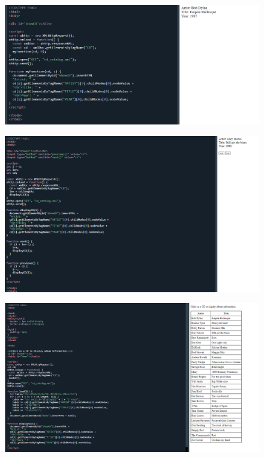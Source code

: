 \documentclass{article}
\begin{document}
\begin{itemize}
		\begin{figure}[H]
			\centering
			\includegraphics[width=1.0\textwidth,keepaspectratio]{img/F14.png}
		\end{figure}

		\begin{figure}[H]
			\centering
			\includegraphics[width=1.0\textwidth,keepaspectratio]{img/F15.png}
		\end{figure}
		\begin{figure}[H]
			\centering
			\includegraphics[width=1.0\textwidth,keepaspectratio]{img/F16.png}
		\end{figure}
	\end{itemize}
\end{document}
